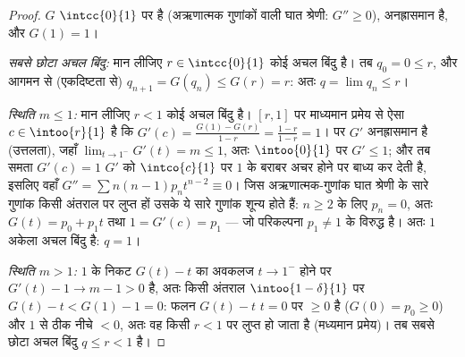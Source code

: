 \begin{proof}
$G$ $\intcc{0}{1}$ पर  है (अऋणात्मक गुणांकों वाली घात श्रेणी: $G'' \geq 0$),
अनह्रासमान है, और $G(1) = 1$।

\emph{सबसे छोटा अचल बिंदु:} मान लीजिए $r \in \intcc{0}{1}$ कोई अचल बिंदु है। तब
$q_0 = 0 \leq r$, और आगमन से (एकदिष्टता से) $q_{n+1} = G(q_n)
\leq G(r) = r$: अतः $q = \lim q_n \leq r$।

\emph{स्थिति $m \leq 1$:} मान लीजिए $r < 1$ कोई अचल बिंदु है। $[r, 1]$ पर
माध्यमान प्रमेय से ऐसा $c \in \intoo{r}{1}$ है कि $G'(c) = \frac{G(1) - G(r)}{1 - r} = \frac{1 - r}{1 - r} = 1$। पर $G'$ अनह्रासमान है
(उत्तलता), जहाँ $\lim_{t\to1^-}G'(t) = m
\leq 1$, अतः $\intoo{0}{1}$ पर $G' \leq 1$; और तब समता $G'(c) =
1$ $G'$ को $\intco{c}{1}$
पर $1$ के बराबर अचर होने पर बाध्य कर देती है, इसलिए वहाँ $G'' = \sum n(n-1)p_nt^{n-2} \equiv 0$।
जिस अऋणात्मक-गुणांक घात श्रेणी के सारे गुणांक किसी अंतराल पर लुप्त
हों उसके ये सारे गुणांक शून्य होते हैं: $n \geq 2$ के लिए $p_n = 0$, अतः $G(t) = p_0
+ p_1t$
तथा $1 = G'(c) = p_1$ --- जो परिकल्पना $p_1 \neq 1$ के विरुद्ध है। अतः $1$ अकेला अचल
बिंदु है: $q = 1$।

\emph{स्थिति $m > 1$:} $1$ के निकट $G(t) - t$ का अवकलज $t \to 1^-$ होने पर $G'(t) -
1 \to m - 1 > 0$ है,
अतः किसी अंतराल $\intoo{1 - \delta}{1}$ पर $G(t) - t < G(1) - 1 = 0$:  फलन $G(t) - t$ $t = 0$ पर $\geq 0$ है ($G(0) = p_0 \geq 0$) और
$1$ से ठीक नीचे $< 0$, अतः वह किसी $r < 1$ पर लुप्त हो जाता है
(मध्यमान प्रमेय)। तब सबसे छोटा अचल बिंदु $q \leq r < 1$ है।
\end{proof}

